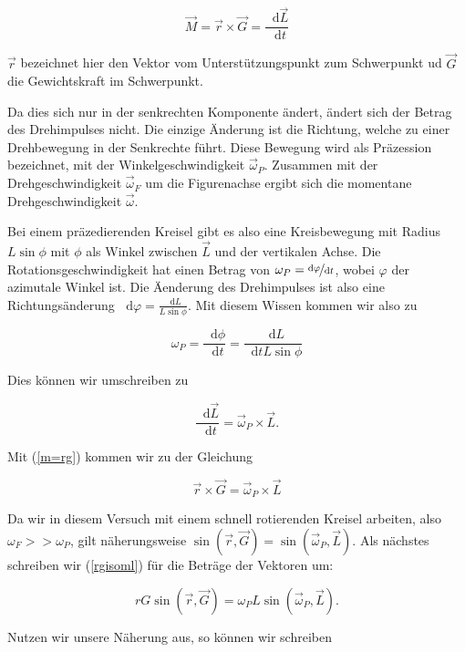 \documentclass[11pt,a4paper]{article}
\newcommand{\dif}{\mathop{}\!\mathrm{d}}
\newcommand{\vphi}{\varphi}
\begin{document}
\begin{equation}
\vec{M}=\vec{r}\times\vec{G}=\frac{\dif\vec{L}}{\dif t}\label{m=rg}
\end{equation}

$\vec{r}$ bezeichnet hier den Vektor vom Unterst\"utzungspunkt zum Schwerpunkt ud $\vec{G}$ die Gewichtskraft im Schwerpunkt.

Da dies sich nur in der senkrechten Komponente \"andert, \"andert sich der Betrag des Drehimpulses nicht. Die einzige \"Anderung ist die Richtung, welche zu einer Drehbewegung in der Senkrechte f\"uhrt. Diese Bewegung wird als Pr\"azession bezeichnet, mit der Winkelgeschwindigkeit $\vec{\omega}_P$. Zusammen mit der Drehgeschwindigkeit $\vec{\omega}_F$ um die Figurenachse ergibt sich die momentane Drehgeschwindigkeit $\vec{\omega}$.

Bei einem pr\"azedierenden Kreisel gibt es also eine Kreisbewegung mit Radius $L\sin\phi$ mit $\phi$ als Winkel zwischen $\vec{L}$ und der vertikalen Achse. Die Rotationsgeschwindigkeit hat einen Betrag von $\omega_P=\nicefrac{\dif\vphi}{\dif t}$, wobei $\vphi$ der azimutale Winkel ist. Die \"Aenderung des Drehimpulses ist also eine Richtungs\"anderung $\dif\vphi=\frac{\dif L}{L\sin\phi}$. Mit diesem Wissen kommen wir also zu

\[
\omega_P=\frac{\dif\phi}{\dif t}=\frac{\dif L}{\dif tL\sin\phi}
\]

Dies k\"onnen wir umschreiben zu

\begin{equation}
\frac{\dif\vec{L}}{\dif t}=\vec{\omega}_P\times\vec{L}.
\end{equation}

Mit (\ref{m=rg}) kommen wir zu der Gleichung

\begin{equation}
\vec{r}\times\vec{G}=\vec{\omega}_P\times\vec{L}\label{rgisoml}
\end{equation}

Da wir in diesem Versuch mit einem schnell rotierenden Kreisel arbeiten, also $\omega_F>>\omega_P$, gilt n\"aherungsweise $\sin(\vec{r},\vec{G})=\sin(\vec{\omega}_P,\vec{L})$. Als n\"achstes schreiben wir (\ref{rgisoml}) f\"ur die Betr\"age der Vektoren um:

\begin{equation}
rG\sin(\vec{r},\vec{G})=\omega_PL\sin(\vec{\omega}_P,\vec{L}).
\end{equation}

Nutzen wir unsere N\"aherung aus, so k\"onnen wir schreiben
\end{document}
